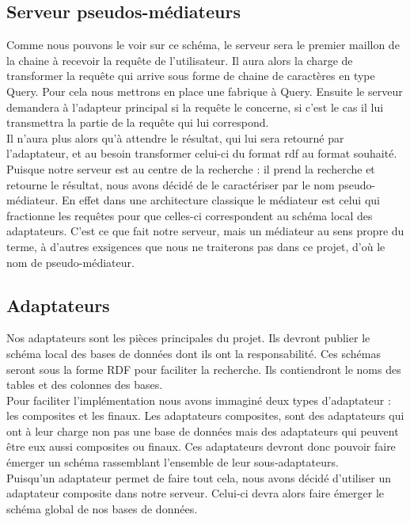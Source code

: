 \documentclass[12pt]{article}
\begin{document}
\subsection{Serveur pseudos-médiateurs}

	Comme nous pouvons le voir sur ce schéma, le serveur sera le premier maillon de la chaine à recevoir la requête de l'utilisateur. Il aura alors la charge de transformer la requête qui arrive sous forme de chaine de caractères en type Query. Pour cela nous mettrons en place une fabrique à Query. Ensuite le serveur demandera à l'adapteur principal si la requête le concerne, si c'est le cas il lui transmettra la partie de la requête qui lui correspond.\\
	\indent Il n'aura plus alors qu'à attendre le résultat, qui lui sera retourné par l'adaptateur, et au besoin transformer celui-ci du format rdf au format souhaité.\\
	\indent Puisque notre serveur est au centre de la recherche : il prend la recherche et retourne le résultat, nous avons décidé de le caractériser par le nom pseudo-médiateur. En effet dans une architecture classique le médiateur est celui qui fractionne les requêtes pour que celles-ci correspondent au schéma local des adaptateurs. C'est ce que fait notre serveur, mais un médiateur au sens propre du terme, à d'autres exsigences que nous ne traiterons pas dans ce projet, d'où le nom de pseudo-médiateur.

\subsection{Adaptateurs}

	Nos adaptateurs sont les pièces principales du projet. Ils devront publier le schéma local des bases de données dont ils ont la responsabilité. Ces schémas seront sous la forme RDF pour faciliter la recherche. Ils contiendront le noms des tables et des colonnes des bases.\\
	\indent Pour faciliter l'implémentation nous avons immaginé deux types d'adaptateur : les composites et les finaux.
	\indent Les adaptateurs composites, sont des adaptateurs qui ont à leur charge non pas une base de données mais des adaptateurs qui peuvent être eux aussi composites ou finaux. Ces adaptateurs devront donc pouvoir faire émerger un schéma rassemblant l'ensemble de leur sous-adaptateurs.\\
	\indent Puisqu'un adaptateur permet de faire tout cela, nous avons décidé d'utiliser un adaptateur composite dans notre serveur. Celui-ci devra alors faire émerger le schéma global de nos bases de données.
\end{document}
